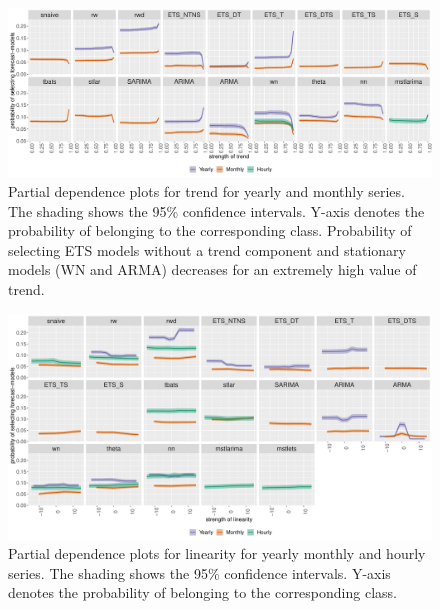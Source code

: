 \documentclass[11pt,a4paper,]{article}
\begin{document}
\begin{figure}[h]

{\centering \includegraphics[width=\textwidth]{figure/pdpyearlytrend-1} 

}

\caption{Partial dependence plots for trend for yearly and monthly series. The shading shows the 95\% confidence intervals. Y-axis denotes the probability of belonging to the corresponding class. Probability of selecting ETS models without a trend component and stationary models (WN and ARMA) decreases for an extremely high value of trend.}\label{fig:pdpyearlytrend}
\end{figure}

\clearpage

\begin{figure}[h]

{\centering \includegraphics[width=\textwidth]{figure/linearity-1} 

}

\caption{Partial dependence plots for linearity for yearly monthly and hourly series. The shading shows the 95\% confidence intervals. Y-axis denotes the probability of belonging to the corresponding class. }\label{fig:linearity}
\end{figure}
\end{document}

